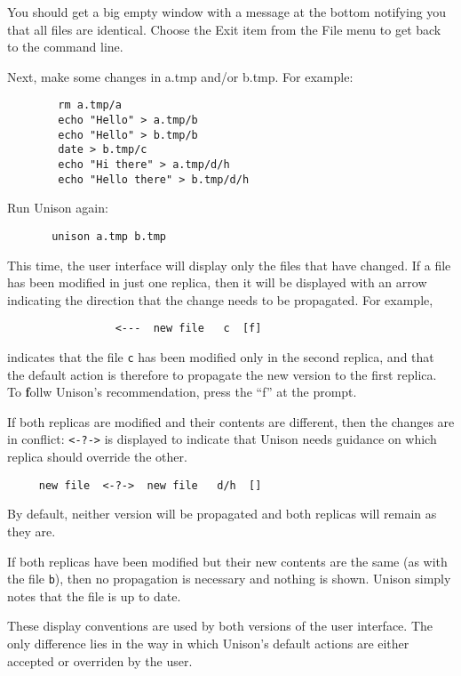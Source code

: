 \documentclass{article}
\begin{document}
\begin{tkui}
You should get a big empty window with a message at the bottom
notifying you that all files are identical.  Choose the Exit item from
the File menu to get back to the command line.
\end{tkui}

Next, make some changes in a.tmp and/or b.tmp.  For example:
\begin{verbatim}
        rm a.tmp/a
        echo "Hello" > a.tmp/b
        echo "Hello" > b.tmp/b
        date > b.tmp/c
        echo "Hi there" > a.tmp/d/h
        echo "Hello there" > b.tmp/d/h
\end{verbatim}
Run Unison again:
\begin{verbatim}
       unison a.tmp b.tmp
\end{verbatim}

This time, the user interface will display only the files that have
changed.  If a file has been modified in just one
replica, then it will be displayed with an arrow indicating the
direction that the change needs to be propagated.  For example, 
\begin{verbatim}
                 <---  new file   c  [f]
\end{verbatim}
\noindent
indicates that the file {\tt c} has been modified only in the second
replica, and that the default action is therefore to propagate the new
version to the first replica.  To {\bf f}ollw Unison's recommendation,
press the ``f'' at the prompt.

If both replicas are modified and their contents are different, then
the changes are in conflict: \texttt{<-?->} is displayed to indicate
that Unison needs guidance on which replica should override the
other.  
\begin{verbatim}
     new file  <-?->  new file   d/h  []
\end{verbatim}
By default, neither version will be propagated and both
replicas will remain as they are.  

If both replicas have been modified but their new contents are the same
(as with the file {\tt b}), then no propagation is necessary and
nothing is shown.  Unison simply notes that the file is up to date.

These display conventions are used by both versions of the user
interface.  The only difference lies in the way in which Unison's
default actions are either accepted or overriden by the user.
\end{document}

